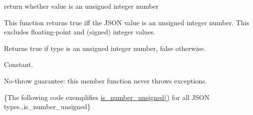 return whether value is an unsigned integer number 

This function returns true iff the J\-S\-O\-N value is an unsigned integer number. This excludes floating-\/point and (signed) integer values.

\begin{DoxyReturn}{Returns}
{\ttfamily true} if type is an unsigned integer number, {\ttfamily false} otherwise.
\end{DoxyReturn}
Constant.

No-\/throw guarantee\-: this member function never throws exceptions.

\{The following code exemplifies {\ttfamily \hyperlink{classnlohmann_1_1basic__json_aa388dc101bc285a98122a38fd2e3a9db}{is\-\_\-number\-\_\-unsigned()}} for all J\-S\-O\-N types.,is\-\_\-number\-\_\-unsigned\}

